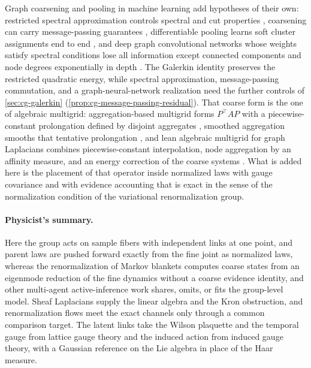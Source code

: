 Graph coarsening and pooling in machine learning add hypotheses of their own:
restricted spectral approximation controls spectral and cut properties
\citep{Loukas2019}, coarsening can carry message-passing guarantees
\citep{JolyKeriven2024}, differentiable pooling learns soft cluster assignments
end to end \citep{Ying2018DiffPool}, and deep graph convolutional networks whose
weights satisfy spectral conditions lose all information except connected
components and node degrees exponentially in depth \citep{OonoSuzuki2020}. The
Galerkin identity preserves the restricted quadratic energy, while spectral
approximation, message-passing commutation, and a graph-neural-network
realization need the further controls of \cref{sec:cg-galerkin}
(\cref{prop:cg-message-passing-residual}). That coarse form is the one of
algebraic multigrid: aggregation-based multigrid forms \(P^\top AP\) with a
piecewise-constant prolongation defined by disjoint aggregates
\citep[Section 2, Eqs.~(2.1)--(2.2)]{Notay2010Aggregation}, smoothed
aggregation smooths that tentative prolongation \citep{VanekMandelBrezina1996},
and lean algebraic multigrid for graph Laplacians combines piecewise-constant
interpolation, node aggregation by an affinity measure, and an energy correction
of the coarse systems \citep{LivneBrandt2012LAMG}. What is added here is the
placement of that operator inside normalized laws with gauge covariance and
with evidence accounting that is exact in the sense of the normalization
condition of the variational renormalization group.

\paragraph{Physicist's summary.}
Here the group acts on sample fibers with independent links at one point, and
parent laws are pushed forward exactly from the fine joint as normalized laws,
whereas the renormalization of Markov blankets computes coarse states from an
eigenmode reduction of the fine dynamics without a coarse evidence identity,
and other multi-agent active-inference work shares, omits, or fits the
group-level model. Sheaf Laplacians supply the linear
algebra and the Kron obstruction, and renormalization flows meet the exact
channels only through a common comparison target. The latent links take the Wilson plaquette and the
temporal gauge from lattice gauge theory and the induced action from induced gauge theory, with a Gaussian
reference on the Lie algebra in place of the Haar measure.
